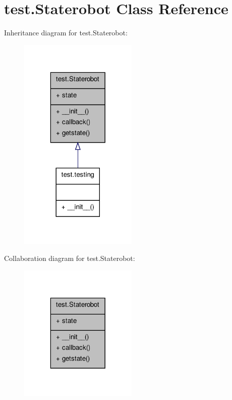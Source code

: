\hypertarget{classtest_1_1_staterobot}{\section{test.\+Staterobot Class Reference}
\label{classtest_1_1_staterobot}
}


Inheritance diagram for test.\+Staterobot\+:\nopagebreak
\begin{figure}[H]
\begin{center}
\leavevmode
\includegraphics[width=160pt]{classtest_1_1_staterobot__inherit__graph}
\end{center}
\end{figure}


Collaboration diagram for test.\+Staterobot\+:\nopagebreak
\begin{figure}[H]
\begin{center}
\leavevmode
\includegraphics[width=160pt]{classtest_1_1_staterobot__coll__graph}
\end{center}
\end{figure}
